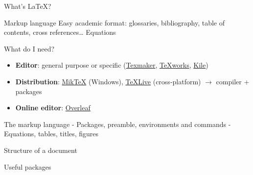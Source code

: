 
\begin{frame}{What's LaTeX?}
 \begin{fullpageitemize}
  \itemR Markup language
  \itemR Easy academic format: glossaries, bibliography, table of contents, cross references\ldots
  \itemR Equations
 \end{fullpageitemize}
\end{frame}

\begin{frame}{What do I need?}
 \begin{itemize}
  \item \textbf{Editor}: general purpose or specific (\href{http://www.xm1math.net/texmaker/}{Texmaker}, \href{https://www.tug.org/texworks/}{TeXworks}, \href{https://kile.sourceforge.io/}{Kile})
  
  \item \textbf{Distribution}: \href{https://miktex.org/}{MikTeX} (Windows), \href{https://tug.org/texlive/}{TeXLive} (cross-platform) $\rightarrow$ compiler + packages
 \end{itemize}
 \vspace{1ex}
 {\color{colororange}}
  \begin{itemize}
  \item \textbf{Online editor}: \href{https://www.overleaf.com/}{Overleaf}
 \end{itemize}
 
\end{frame}

\begin{frame}{The markup language}
- Packages, preamble, environments and commands
- Equations, tables, titles, figures 
\end{frame}

\begin{frame}{Structure of a document}

\end{frame}

\begin{frame}{Useful packages}

\end{frame}

